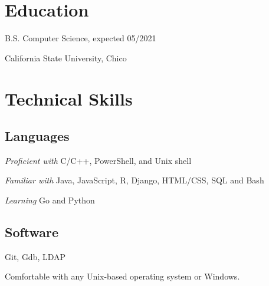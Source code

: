 \documentclass[letterpaper]{article}
\renewenvironment{itemize}{
  \begin{list}{}{
    \setlength{\leftmargin}{1.5em}
  }
}{
  \end{list}
}
\begin{document}
\begin{minipage}[t]{0.475\linewidth}
    \section*{Education}
    \begin{itemize}
    \item B.S. Computer Science, expected 05/2021

        California State University, Chico
    \end{itemize}
    \section*{Technical Skills}

    \subsection*{Languages}
    \begin{itemize}
        \item \emph{Proficient with} C/C++, PowerShell, and Unix shell
        \item \emph{Familiar with} Java, JavaScript, R, Django, HTML/CSS, SQL and Bash
        \item \emph{Learning} Go and Python
    \end{itemize}
    \subsection*{Software}
    \begin{itemize}
    \item Git, Gdb, LDAP
    \item Comfortable with any Unix-based operating system or Windows.
    \end{itemize}
\end{minipage}
\end{document}
